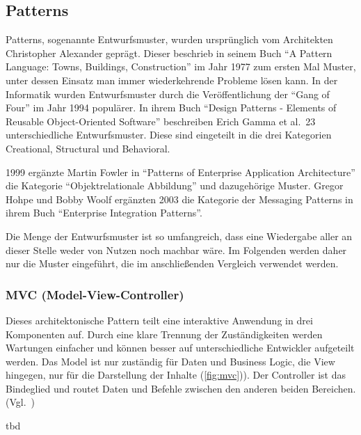 \subsection{Patterns}
Patterns, sogenannte Entwurfsmuster, wurden ursprünglich vom Architekten Christopher Alexander geprägt.
Dieser beschrieb in seinem Buch \enquote{A Pattern Language: Towns, Buildings, Construction}\cite{a-pattern-language} im Jahr 1977 zum ersten Mal Muster, unter dessen Einsatz man immer wiederkehrende Probleme lösen kann.
In der Informatik wurden Entwurfsmuster durch die Veröffentlichung der \enquote{Gang of Four} im Jahr 1994 populärer.
In ihrem Buch \enquote{Design Patterns - Elements of Reusable Object-Oriented Software}\cite{gamma-design-patterns} beschreiben Erich Gamma et al.\ 23 unterschiedliche Entwurfsmuster.
Diese sind eingeteilt in die drei Kategorien Creational, Structural und Behavioral.

1999 ergänzte Martin Fowler in \enquote{Patterns of Enterprise Application Architecture}\cite{patterns-of-enterprise-application-architecture} die Kategorie \enquote{Objektrelationale Abbildung} und dazugehörige Muster.
Gregor Hohpe und Bobby Woolf ergänzten 2003 die Kategorie der Messaging Patterns in ihrem Buch \enquote{Enterprise Integration Patterns}\cite{enterprise-integration-patterns}.

Die Menge der Entwurfsmuster ist so umfangreich, dass eine Wiedergabe aller an dieser Stelle weder von Nutzen noch machbar wäre.
Im Folgenden werden daher nur die Muster eingeführt, die im anschließenden Vergleich verwendet werden.

\subsubsection{MVC (Model-View-Controller)}
\color{red}
Dieses architektonische Pattern teilt eine interaktive Anwendung in drei Komponenten auf.
Durch eine klare Trennung der Zuständigkeiten werden Wartungen einfacher und können besser auf unterschiedliche Entwickler aufgeteilt werden.
Das Model ist nur zuständig für Daten und Business Logic, die View hingegen, nur für die Darstellung der Inhalte (\ref{fig:mvc})).
Der Controller ist das Bindeglied und routet Daten und Befehle zwischen den anderen beiden Bereichen.
(Vgl.~\cite{buschmann-pattern-oriented-software-architecture})

tbd
\color{black}

